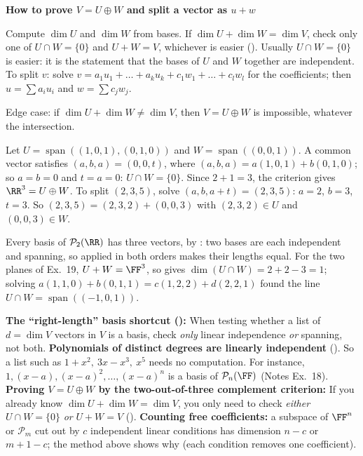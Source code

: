 \documentclass[10pt]{scrartcl}
\DeclareMathOperator{\spn}{span}
\newcommand{\PP}{\mathcal P}
\newenvironment{methodbox}[1]{\begin{mdframed}[style=methodstyle]\textbf{\color{NavyBlue}#1}\par\vspace{2pt}}{\end{mdframed}}
\begin{document}
\begin{methodbox}{How to prove $V=U\oplus W$ and split a vector as $u+w$}
  \begin{steps}
    \ii Compute $\dim U$ and $\dim W$ from bases.
    \ii If $\dim U+\dim W=\dim V$, check only one of $U\cap W=\{0\}$ and $U+W=V$, whichever is easier (). Usually $U\cap W=\{0\}$ is easier: it is the statement that the bases of $U$ and $W$ together are independent.
    \ii To split $v$: solve $v=a_1u_1+\dots+a_ku_k+c_1w_1+\dots+c_lw_l$ for the coefficients; then $u=\sum a_iu_i$ and $w=\sum c_jw_j$.
  \end{steps}
  Edge case: if $\dim U+\dim W\ne\dim V$, then $V=U\oplus W$ is impossible, whatever the intersection.
\end{methodbox}

\begin{example*}
  Let $U=\spn((1,0,1),(0,1,0))$ and $W=\spn((0,0,1))$. A common vector satisfies $(a,b,a)=(0,0,t)$, where $(a,b,a)=a(1,0,1)+b(0,1,0)$; so $a=b=0$ and $t=a=0$: $U\cap W=\{0\}$. Since $2+1=3$, the criterion gives $\RR^3=U\oplus W$. To split $(2,3,5)$, solve $(a,b,a+t)=(2,3,5)$: $a=2$, $b=3$, $t=3$. So $(2,3,5)=(2,3,2)+(0,0,3)$ with $(2,3,2)\in U$ and $(0,0,3)\in W$.
\end{example*}

\revisit Every basis of $\PP_2(\RR)$ has three vectors, by : two bases are each independent and spanning, so  applied in both orders makes their lengths equal. For the two planes of Ex.~19, $U+W=\FF^3$, so  gives $\dim(U\cap W)=2+2-3=1$; solving $a(1,1,0)+b(0,1,1)=c(1,2,2)+d(2,2,1)$ found the line $U\cap W=\spn((-1,0,1))$.

\begin{shortcuts}
  \ii \textbf{The ``right-length'' basis shortcut ():} When testing whether a list of $d=\dim V$ vectors in $V$ is a basis, check \emph{only} linear independence \emph{or} spanning, not both.
  \ii \textbf{Polynomials of distinct degrees are linearly independent} (). So a list such as $1+x^2,\ 3x-x^3,\ x^5$ needs no computation. For instance, $1,(x-a),(x-a)^2,\dots,(x-a)^n$ is a basis of $\PP_n(\FF)$ (Notes Ex.~18).
  \ii \textbf{Proving $V=U\oplus W$ by the two-out-of-three complement criterion:} If you already know $\dim U+\dim W=\dim V$, you only need to check \emph{either} $U\cap W=\{0\}$ \emph{or} $U+W=V$ ().
  \ii \textbf{Counting free coefficients:} a subspace of $\FF^n$ or $\PP_m$ cut out by $c$ independent linear conditions has dimension $n-c$ or $m+1-c$; the method above shows why (each condition removes one coefficient).
\end{shortcuts}
\end{document}

